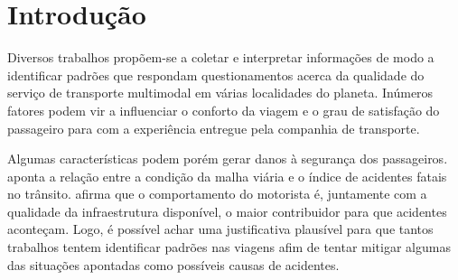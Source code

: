 \documentclass[12pt]{report} %
\begin{document}
	
	\pagebreak
	
	
	\renewcommand{\cftdot}{}
	\tableofcontents %
	
	\pagebreak
	
	
	\listoffigures
	
	\pagebreak
	
	
	\listoftables
		
	\pagebreak
	
	
	\printterms[database=acronym,columns=1,prelocation=hfill,style=align]
	
	\label{lastpretextualpage}
	\pagebreak
	
	
	\justifying
	
\chapter{Introdução}
\label{sec:introducao}

Diversos trabalhos propõem-se a coletar e interpretar informações de modo a identificar padrões que respondam questionamentos acerca da qualidade do serviço de transporte multimodal em várias localidades do planeta. Inúmeros fatores podem vir a influenciar o conforto da viagem e o grau de satisfação do passageiro para com a experiência entregue pela companhia de transporte. 

Algumas características podem porém gerar danos à segurança dos passageiros. \citep{world2015global} aponta a relação entre a condição da malha viária e o índice de acidentes fatais no trânsito. \citep{euPolicyDep} afirma que o comportamento do motorista é, juntamente com a qualidade da infraestrutura disponível, o maior contribuidor para que acidentes aconteçam. Logo, é possível achar uma justificativa plausível para que tantos trabalhos tentem identificar padrões nas viagens afim de tentar mitigar algumas das situações apontadas como possíveis causas de acidentes.
\end{document}
